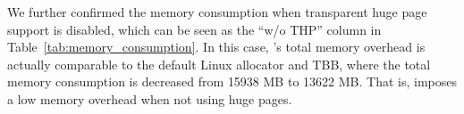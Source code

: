 



We further confirmed the memory consumption when transparent huge page support is disabled, which can be seen as the ``w/o THP'' column in Table~\ref{tab:memory_consumption}. In this case, \NM{}'s total memory overhead is actually comparable to the default Linux allocator and TBB, where the total memory consumption is decreased from 15938 MB to 13622 MB. That is, \NM{} imposes a low memory overhead when not using huge pages. 


 
